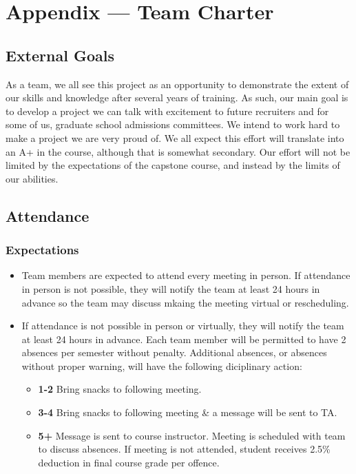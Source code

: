 \documentclass{article}
\begin{document}
\newpage{}

\section*{Appendix --- Team Charter}


\subsection*{External Goals}

As a team, we all see this project as an opportunity to demonstrate the extent of our skills and knowledge after several years of training.
As such, our main goal is to develop a project we can talk with excitement to future recruiters and for some of us, graduate school admissions committees.
We intend to work hard to make a project we are very proud of. We all expect this effort will translate into an A+ in the course, although that is somewhat
secondary. Our effort will not be limited by the expectations of the capstone course, and instead by the limits of our abilities.

\subsection*{Attendance}

\subsubsection*{Expectations}
\begin{itemize}
\item Team members are expected to attend every meeting in person. If attendance in person is not possible, they will notify the team at least 24 hours 
in advance so the team may discuss mkaing the meeting virtual or rescheduling.
\item If attendance is not possible in person or virtually, they will notify the team at least 24 hours in advance. Each team member will be permitted to have 2 absences per semester 
without penalty. Additional absences, or absences without proper warning, will have the following diciplinary action:

\begin{itemize}
  \item[] \textbf{1-2} Bring snacks to following meeting.
  \item[] \textbf{3-4} Bring snacks to following meeting \& a message will be sent to TA.
  \item[] \textbf{5+} Message is sent to course instructor. Meeting is scheduled with team to discuss absences. If meeting is not attended, student receives 2.5\% deduction in final course grade per offence.
\end{itemize}
\end{itemize}
\end{document}
